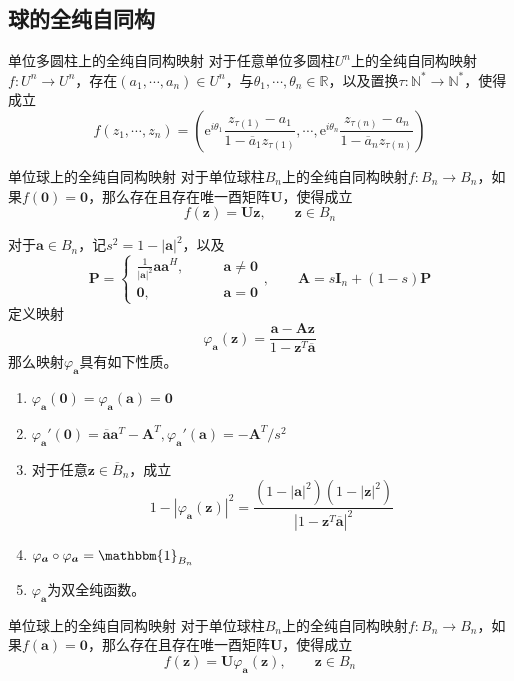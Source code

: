 \documentclass[lang = cn, scheme = chinese, thmcnt = section]{elegantbook}
\newcommand{\N}{\mathbb{N}}            %
\newcommand{\R}{\mathbb{R}}            %
\newcommand{\bs}{\boldsymbol}          %
\begin{document}
\subsection{球的全纯自同构}

\begin{theorem}{单位多圆柱上的全纯自同构映射}
	对于任意单位多圆柱$U^n$上的全纯自同构映射$f:U^n\to U^n$，存在$(a_1,\cdots,a_n)\in U^n$，与$\theta_1,\cdots,\theta_n\in\R$，以及置换$\tau:\N^*\to\N^*$，使得成立
	$$
	f(z_1,\cdots,z_n)
	=\left(
	\mathrm{e}^{i\theta_1}\frac{z_{\tau(1)}-a_1}{1-\overline{a}_1z_{\tau(1)}},\cdots,\mathrm{e}^{i\theta_n}\frac{z_{\tau(n)}-a_n}{1-\overline{a}_nz_{\tau(n)}}
	\right)
	$$
\end{theorem}

\begin{theorem}{单位球上的全纯自同构映射}
	对于单位球柱$B_n$上的全纯自同构映射$f:B_n\to B_n$，如果$f(\bs{0})=\bs{0}$，那么存在且存在唯一酉矩阵$\bs{U}$，使得成立
	$$
	f(\bs{z})=\bs{U}\bs{z},\qquad \bs{z}\in B_n
	$$
\end{theorem}

\begin{theorem}
	对于$\bs{a}\in B_n$，记$s^2=1-|\bs{a}|^2$，以及
	$$
	\bs{P}=\begin{cases}
		\displaystyle \frac{1}{|\bs{a}|^2}\bs{a}\bs{a}^H,\qquad & \bs{a}\ne \bs{0}\\
		\bs{0},\qquad & \bs{a}=\bs{0}
	\end{cases},\qquad 
	\bs{A}=s\bs{I}_n+(1-s)\bs{P}
	$$
	定义映射
	$$
	\varphi_{\bs{a}}(\bs{z})=\frac{\bs{a}-\bs{A}\bs{z}}{1-\bs{z}^T\overline{\bs{a}}}
	$$
	那么映射$\varphi_{\bs{a}}$具有如下性质。
	\begin{enumerate}
		\item $\varphi_{\bs{a}}(\bs{0})=\varphi_{\bs{a}}(\bs{a})=\bs{0}$
		\item $\varphi_{\bs{a}}'(\bs{0})=\overline{\bs{a}}\bs{a}^T-\bs{A}^T,\varphi_{\bs{a}}'(\bs{a})=-\bs{A}^T/s^2$
		\item 对于任意$\bs{z}\in\overline{B}_n$，成立
		$$
		1-|\varphi_{\bs{a}}(\bs{z})|^2
		=\frac{(1-|\bs{a}|^2)(1-|\bs{z}|^2)}{|1-\bs{z}^T\overline{\bs{a}}|^2}
		$$
		\item $\varphi_{\bs{a}}\circ \varphi_{\bs{a}}=\mathbbm{1}_{B_n}$
		\item $\varphi_{\bs{a}}$为双全纯函数。
	\end{enumerate}
\end{theorem}

\begin{theorem}{单位球上的全纯自同构映射}
	对于单位球柱$B_n$上的全纯自同构映射$f:B_n\to B_n$，如果$f(\bs{a})=\bs{0}$，那么存在且存在唯一酉矩阵$\bs{U}$，使得成立
	$$
	f(\bs{z})=\bs{U}\varphi_{\bs{a}}(\bs{z}),\qquad \bs{z}\in B_n
	$$
\end{theorem}
\end{document}
